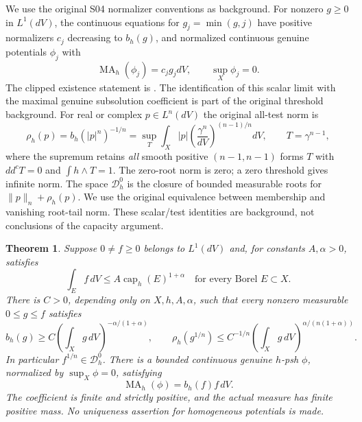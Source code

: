 \documentclass[11pt]{article}
\newcommand{\ddc}{dd^c}
\newcommand{\MA}{\operatorname{MA}}
\newcommand{\capH}{\operatorname{cap}}
\newcommand{\Dzero}{\mathcal D_h^0}
\newtheorem{theorem}{Theorem}
\theoremstyle{remark}\newtheorem{remark}[theorem]{Remark}
\begin{document}
We use the original S04 normalizer conventions as background. For
nonzero $g\geq0$ in $L^1(dV)$, the continuous equations for
$g_j=\min(g,j)$ have positive normalizers $c_j$ decreasing to $b_h(g)$,
and normalized continuous genuine potentials $\phi_j$ with
\[
 \MA_h(\phi_j)=c_jg_jdV,\qquad \sup_X\phi_j=0.
\]
The clipped existence statement is \cite[Theorem 0.1]{KN}.
The identification of this scalar limit with the maximal genuine
subsolution coefficient is part of the original threshold background.
For real or complex $p\in L^n(dV)$ the original all-test norm is
\[
 \rho_h(p)=b_h(|p|^n)^{-1/n}
 =\sup_T\int_X|p|\left(\frac{\gamma^n}{dV}\right)^{(n-1)/n}dV,
 \qquad T=\gamma^{n-1},
\]
where the supremum retains \emph{all} smooth positive $(n-1,n-1)$ forms
$T$ with $\ddc T=0$ and $\int h\wedge T=1$. The zero-root norm is zero;
a zero threshold gives infinite norm. The space $\Dzero$ is the closure
of bounded measurable roots for $\|p\|_n+\rho_h(p)$. We use the original
equivalence between membership and vanishing root-tail norm.
These scalar/test identities are background, not conclusions of the
capacity argument.

\begin{theorem}\label{th:main}
Suppose $0\ne f\geq0$ belongs to $L^1(dV)$ and, for constants
$A,\alpha>0$, satisfies
\begin{equation}\label{eq:power}
 \int_E f\,dV\leq A\capH_h(E)^{1+\alpha}
 \quad\text{for every Borel }E\subset X.
\end{equation}
There is $C>0$, depending only on $X,h,A,\alpha$, such that every
nonzero measurable $0\leq g\leq f$ satisfies
\begin{equation}\label{eq:critical}
 b_h(g)\geq C\left(\int_Xg\,dV\right)^{-\alpha/(1+\alpha)},
 \qquad
 \rho_h(g^{1/n})\leq C^{-1/n}
       \left(\int_Xg\,dV\right)^{\alpha/(n(1+\alpha))}.
\end{equation}
In particular $f^{1/n}\in\Dzero$. There is a bounded continuous
genuine $h$-psh $\phi$, normalized by $\sup_X\phi=0$, satisfying
\begin{equation}\label{eq:exact}
 \MA_h(\phi)=b_h(f)f\,dV.
\end{equation}
The coefficient is finite and strictly positive, and the actual measure
has finite positive mass. No uniqueness assertion for homogeneous
potentials is made.
\end{theorem}
\end{document}

